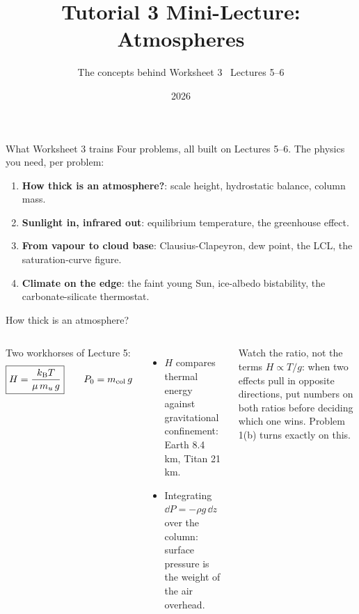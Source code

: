 \documentclass[aspectratio=169, 11pt]{beamer}
\title[T3 mini-lecture: Atmospheres]{Tutorial 3 Mini-Lecture:\\Atmospheres}
\subtitle{The concepts behind Worksheet 3 \textbullet\ Lectures 5--6}
\author{}
\institute{Kapteyn Astronomical Institute\\University of Groningen}
\date{2026}
\begin{document}
\begin{frame}
  \titlepage
\end{frame}

\begin{frame}{What Worksheet 3 trains}
  Four problems, all built on Lectures 5--6. The physics you need, per problem:
  \vskip6pt\relax
  \begin{enumerate}
    \item \textbf{How thick is an atmosphere?}: scale height, hydrostatic balance, column mass.
    \item \textbf{Sunlight in, infrared out}: equilibrium temperature, the greenhouse effect.
    \item \textbf{From vapour to cloud base}: Clausius-Clapeyron, dew point, the LCL, the saturation-curve figure.
    \item \textbf{Climate on the edge}: the faint young Sun, ice-albedo bistability, the carbonate-silicate thermostat.
  \end{enumerate}
  \vskip2pt\relax
\end{frame}

\begin{frame}{How thick is an atmosphere?}
  \small
  \begin{columns}[T]
    Two workhorses of Lecture 5:
    \[
      \boxed{H = \frac{k_{\mathrm{B}} T}{\mu\,m_u\,g}}
      \qquad
      P_0 = m_{\mathrm{col}}\,g
    \]
    \begin{itemize}
      \item $H$ compares thermal energy against gravitational confinement: Earth 8.4 km, Titan 21 km.
      \item Integrating $\dd P = -\rho g\,\dd z$ over the column: surface pressure is the weight of the air overhead.
    \end{itemize}

    \begin{block}{Watch the ratio, not the terms}
      $H \propto T/g$: when two effects pull in opposite directions, put numbers on both ratios before deciding which one wins. Problem 1(b) turns exactly on this.
    \end{block}
  \end{columns}
  \vskip2pt\relax
\end{frame}
\end{document}
